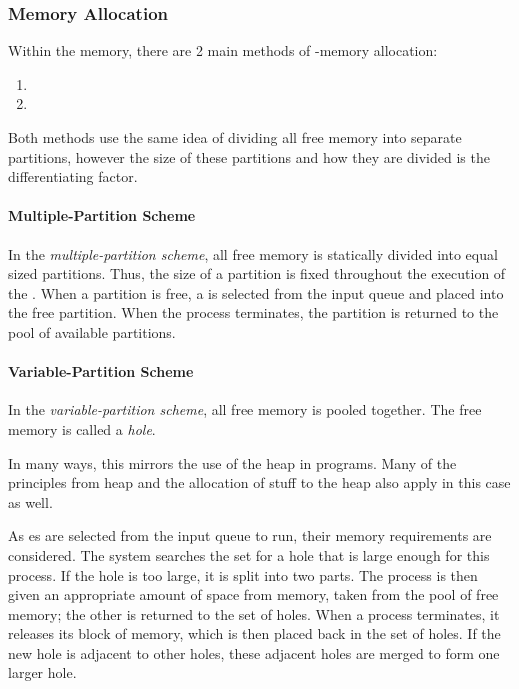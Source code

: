 \subsubsection{Memory Allocation}\label{subsubsec:Contiguous_Memory_Allocation}
Within the  memory, there are 2 main methods of -memory allocation:
\begin{enumerate}[noitemsep]
\item {}
\item {}
\end{enumerate}

Both methods use the same idea of dividing all free memory into separate partitions, however the size of these partitions and how they are divided is the differentiating factor.

\paragraph{Multiple-Partition Scheme}\label{par:Multiple_Partition_Scheme}
In the \emph{multiple-partition scheme}, all free memory is statically divided into equal sized partitions.
Thus, the size of a partition is fixed throughout the execution of the .
When a partition is free, a  is selected from the input queue and placed into the free partition.
When the process terminates, the partition is returned to the pool of available partitions.

\paragraph{Variable-Partition Scheme}\label{par:Variable_Partition_Scheme}
In the \emph{variable-partition scheme}, all free memory is pooled together.
The free memory is called a \emph{hole}.

\begin{blackbox}
  In many ways, this mirrors the use of the heap in programs.
  Many of the principles from heap and the allocation of stuff to the heap also apply in this case as well.
\end{blackbox}

As es are selected from the input queue to run, their memory requirements are considered.
The system searches the set for a hole that is large enough for this process.
If the hole is too large, it is split into two parts.
The process is then given an appropriate amount of space from memory, taken from the pool of free memory; the other is returned to the set of holes.
When a process terminates, it releases its block of memory, which is then placed back in the set of holes.
If the new hole is adjacent to other holes, these adjacent holes are merged to form one larger hole.

